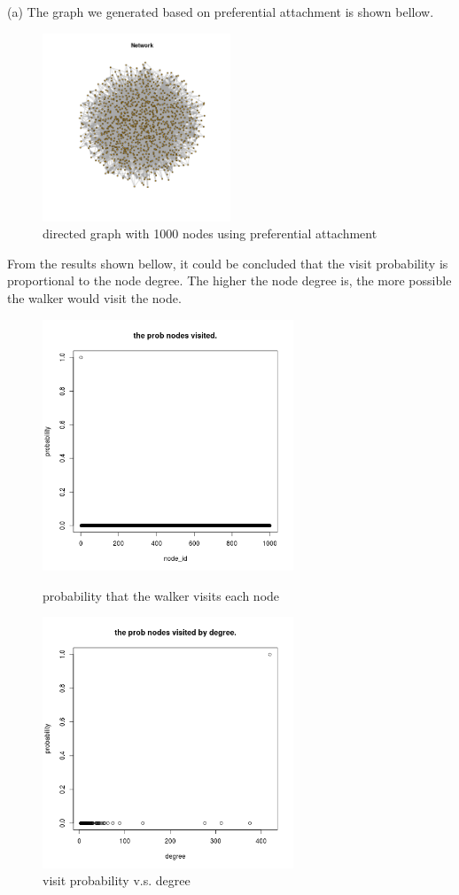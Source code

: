\documentclass[draftcls,12pt,onecolumn]{IEEEtran}
\begin{document}
(a) The graph we generated based on preferential attachment is shown bellow. 
\begin{figure}[H]
\centering
\includegraphics[width=0.5\textwidth]{3_network.png}
\caption{directed graph with 1000 nodes using preferential attachment }
\label{fig18}
\end{figure}
From the results shown bellow, it could be concluded that the visit probability is proportional to the node degree. The higher the node degree is, the more possible the walker would visit the node.
\begin{figure}[htbp]
\centering
\begin{minipage}[t]{0.48\textwidth}
\centering
\includegraphics[width=7.5cm]{3_a_rw_prob.png}
\caption{probability that the walker visits each node}
\label{fig19}
\end{minipage}
\begin{minipage}[t]{0.48\textwidth}
\centering
\includegraphics[width=7.5cm]{3_a_rw_prob_by_degree.png}
\caption{visit probability v.s. degree}
\label{fig20}
\end{minipage}
\end{figure}
\end{document}
